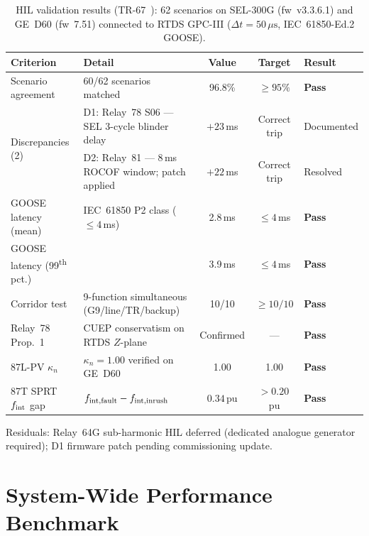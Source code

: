 \begin{table}[htbp]
\centering
\caption{HIL validation results (TR-67~\cite{SAMBP_TR67}): 62 scenarios on
         SEL-300G (fw~v3.3.6.1) and GE~D60 (fw~7.51) connected to
         RTDS GPC-III ($\Delta t = 50\,\mu\text{s}$, IEC~61850-Ed.2 GOOSE).}
\label{tab:ch7_hil_results}
\renewcommand{\arraystretch}{1.08}
\small
\begin{tabularx}{\textwidth}{@{}p{3.8cm}Xccl@{}}
\toprule
Criterion & Detail & Value & Target & Result \\
\midrule
Scenario agreement & 60/62 scenarios matched & 96.8\% & $\geq 95\%$ & \textbf{Pass} \\
\midrule
\multirow{2}{*}{Discrepancies (2)} &
  D1: Relay~78 S06 — SEL 3-cycle blinder delay & $+23$\,ms & Correct trip & Documented \\
& D2: Relay~81 — 8\,ms ROCOF window; patch applied & $+22$\,ms & Correct trip & Resolved \\
\midrule
GOOSE latency (mean) & IEC~61850 P2 class ($\leq 4$\,ms) & 2.8\,ms & $\leq 4$\,ms & \textbf{Pass} \\
GOOSE latency (99\textsuperscript{th} pct.) & & 3.9\,ms & $\leq 4$\,ms & \textbf{Pass} \\
\midrule
Corridor test & 9-function simultaneous (G9/line/TR/backup) & 10/10 & $\geq 10/10$ & \textbf{Pass} \\
\midrule
Relay~78 Prop.~1 & CUEP conservatism on RTDS $Z$-plane & Confirmed & — & \textbf{Pass} \\
87L-PV $\kappa_n$ & $\kappa_n = 1.00$ verified on GE~D60 & 1.00 & 1.00 & \textbf{Pass} \\
87T SPRT $f_{\rm int}$ gap & $f_{\rm int,fault} - f_{\rm int,inrush}$ & $0.34$\,pu & $> 0.20$\,pu & \textbf{Pass} \\
\bottomrule
\end{tabularx}
\smallskip\noindent\footnotesize
Residuals: Relay~64G sub-harmonic HIL deferred (dedicated analogue generator
required); D1 firmware patch pending commissioning update.
\end{table}

\section{System-Wide Performance Benchmark}
\label{sec:ch7_perf}


